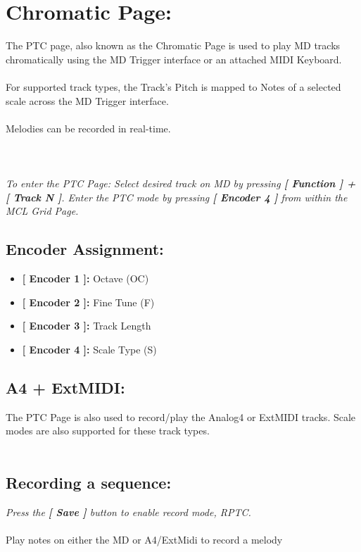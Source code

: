 \chapter{Chromatic Page:}
The PTC page, also known as the  Chromatic Page is used to play MD tracks chromatically using the MD Trigger interface or an attached MIDI Keyboard.\\
\\For supported track types, the Track’s Pitch is mapped to Notes of a selected scale across the MD Trigger interface.\\
\\Melodies can be recorded in real-time.\\
\\
\\\\
\textit{To enter the PTC Page: Select desired track on MD by pressing \textbf{[ Function ] + [ Track N ]}. Enter the PTC mode by pressing \textbf{[ Encoder 4 ] }from within the MCL Grid Page.}
\section{Encoder Assignment:}

	\begin{itemize}
		\item \textbf{[ Encoder 1 ]: } Octave (OC)
		\item \textbf{[ Encoder 2 ]: } Fine Tune (F)
		\item \textbf{[ Encoder 3 ]: } Track Length
		\item \textbf{[ Encoder 4 ]: } Scale Type (S)
	\end{itemize}
\section{A4 + ExtMIDI:}
The PTC Page is also used to record/play the Analog4 or ExtMIDI tracks. Scale modes are also supported for these track types.\\
\\
\section{Recording a sequence:}
\textit{Press the \textbf{[ Save ] }button to enable record mode, RPTC.\\}
\\Play notes on either the MD or A4/ExtMidi to record a melody

